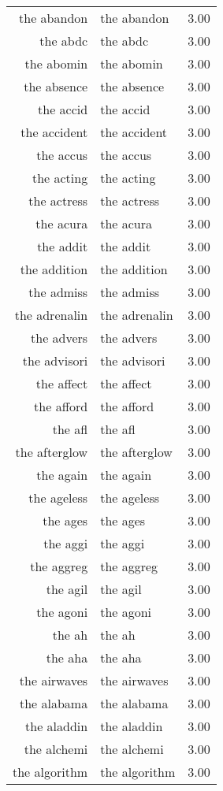 \begin{table}[ht]
\begin{tabular}{rlr}
  the abandon & the abandon & 3.00 \\ 
  the abdc & the abdc & 3.00 \\ 
  the abomin & the abomin & 3.00 \\ 
  the absence & the absence & 3.00 \\ 
  the accid & the accid & 3.00 \\ 
  the accident & the accident & 3.00 \\ 
  the accus & the accus & 3.00 \\ 
  the acting & the acting & 3.00 \\ 
  the actress & the actress & 3.00 \\ 
  the acura & the acura & 3.00 \\ 
  the addit & the addit & 3.00 \\ 
  the addition & the addition & 3.00 \\ 
  the admiss & the admiss & 3.00 \\ 
  the adrenalin & the adrenalin & 3.00 \\ 
  the advers & the advers & 3.00 \\ 
  the advisori & the advisori & 3.00 \\ 
  the affect & the affect & 3.00 \\ 
  the afford & the afford & 3.00 \\ 
  the afl & the afl & 3.00 \\ 
  the afterglow & the afterglow & 3.00 \\ 
  the again & the again & 3.00 \\ 
  the ageless & the ageless & 3.00 \\ 
  the ages & the ages & 3.00 \\ 
  the aggi & the aggi & 3.00 \\ 
  the aggreg & the aggreg & 3.00 \\ 
  the agil & the agil & 3.00 \\ 
  the agoni & the agoni & 3.00 \\ 
  the ah & the ah & 3.00 \\ 
  the aha & the aha & 3.00 \\ 
  the airwaves & the airwaves & 3.00 \\ 
  the alabama & the alabama & 3.00 \\ 
  the aladdin & the aladdin & 3.00 \\ 
  the alchemi & the alchemi & 3.00 \\ 
  the algorithm & the algorithm & 3.00 \\ 

\end{tabular}
\end{table}
